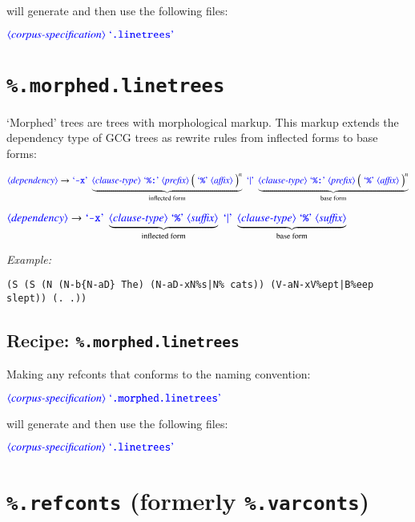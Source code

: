 \documentclass[12pt]{report}
\def\blue{\color{blue}}
\def\magenta{\color{magenta}}
\def\red{\color{red}}
\begin{document}
will generate and then use the following files:

$\dtype{corpus-specification} \ \dcode{.linetrees}$


\section{\blue\tt \%.morphed.linetrees}
\label{sect:morph}

`Morphed' trees are trees with morphological markup.
%
This markup extends the dependency type of GCG trees as rewrite rules from inflected forms to base forms:

$\dtype{dependency} \rightarrow \dcode{-x} \ \underbrace{\dtype{clause-type} \ \dcode{\%:} \ \dtype{prefix} \ \Big( \ \dcode{\%} \ \dtype{affix} \ \Big)^n}_\text{inflected form}
                             \ \dcode{$|$} \ \underbrace{\dtype{clause-type} \ \dcode{\%:} \ \dtype{prefix} \ \Big( \ \dcode{\%} \ \dtype{affix} \ \Big)^n}_\text{base form}$

$\dtype{dependency} \rightarrow \dcode{-x} \ \underbrace{\dtype{clause-type} \ \dcode{\%} \ \dtype{suffix}}_\text{inflected form}
                             \ \dcode{$|$} \ \underbrace{\dtype{clause-type} \ \dcode{\%} \ \dtype{suffix}}_\text{base form}$


\textit{Example:}
{\magenta\begin{verbatim}
(S (S (N (N-b{N-aD} The) (N-aD-xN%s|N% cats)) (V-aN-xV%ept|B%eep slept)) (. .))
\end{verbatim}
}

\subsection{Recipe: {\blue\tt \%.morphed.linetrees}}


Making any refconts that conforms to the naming convention:

$\dtype{corpus-specification} \ \dcode{.morphed.linetrees}$

will generate and then use the following files:

$\dtype{corpus-specification} \ \dcode{.linetrees}$


\section{{\blue\tt \%.refconts} (formerly {\red\tt \%.varconts})}
\label{sect:refconts}
\end{document}
